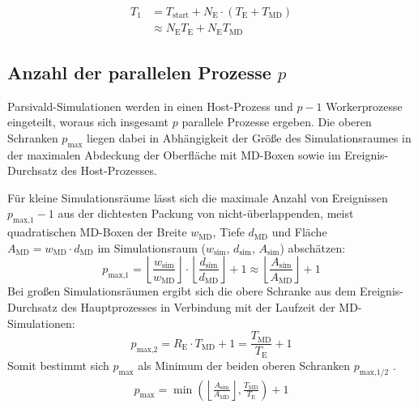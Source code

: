 \begin{align}
  T_1 & = T_\text{start} + N_\text{E} \cdot (T_\text{E} + T_\text{MD}) \\
      & \approx N_\text{E} T_\text{E} + N_\text{E} T_\text{MD}
\end{align}

\subsection{Anzahl der parallelen Prozesse \texorpdfstring{$p$}{p}}

Parsivald-Simulationen werden in einen Host-Prozess und $p-1$ Workerprozesse eingeteilt, woraus sich insgesamt $p$ parallele Prozesse ergeben.
Die oberen Schranken $p_\text{max}$ liegen dabei in Abhängigkeit der Größe des Simulationsraumes in der maximalen Abdeckung der Oberfläche mit MD-Boxen sowie im Ereignis-Durchsatz des Host-Prozesses.

Für kleine Simulationsräume lässt sich die maximale Anzahl von Ereignissen $p_\text{max,1}-1$ aus der dichtesten Packung von nicht-überlappenden, meist quadratischen MD-Boxen der Breite $w_\text{MD}$, Tiefe $d_\text{MD}$ und Fläche $A_\text{MD} = w_\text{MD} \cdot d_\text{MD}$ im Simulationsraum ($w_\text{sim}$, $d_\text{sim}$, $A_\text{sim}$) abschätzen:
\begin{equation}
  p_\text{max,1} = \left\lfloor\frac{w_\text{sim}}{w_\text{MD}}\right\rfloor \cdot \left\lfloor\frac{d_\text{sim}}{d_\text{MD}}\right\rfloor + 1 \approx \left\lfloor\frac{A_\text{sim}}{A_\text{MD}}\right\rfloor + 1
  \label{eq:pmax1}
\end{equation}
Bei großen Simulationsräumen ergibt sich die obere Schranke aus dem Ereignis-Durchsatz des Hauptprozesses in Verbindung mit der Laufzeit der MD-Simulationen:
\begin{equation}
  p_\text{max,2} = R_\text{E} \cdot T_\text{MD} + 1 = \frac{T_\text{MD}}{T_\text{E}} + 1
  \label{eq:pmax2}
\end{equation}
Somit bestimmt sich $p_\text{max}$ als Minimum der beiden oberen Schranken $p_\text{max,1/2}$ .
\begin{align}
  p_\text{max} = \min\left(\left\lfloor\frac{A_\text{sim}}{A_\text{MD}}\right\rfloor, \frac{T_\text{MD}}{T_\text{E}}\right) + 1
  \label{eq:pmax}
\end{align}

